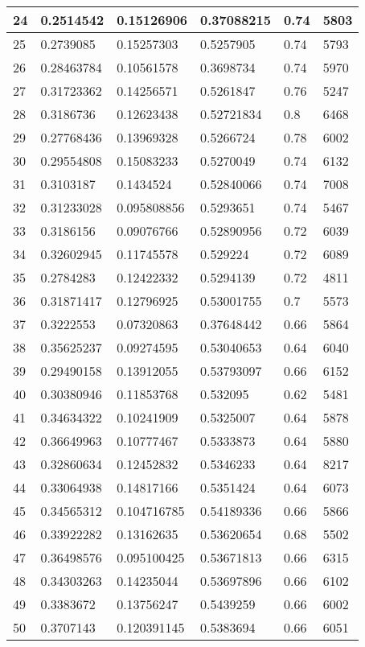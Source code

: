 \begin{longtable}{|l|l|l|l|l|l|}
24 & 0.2514542 & 0.15126906 & 0.37088215 & 0.74 & 5803 \\ \hline 
25 & 0.2739085 & 0.15257303 & 0.5257905 & 0.74 & 5793 \\ \hline 
26 & 0.28463784 & 0.10561578 & 0.3698734 & 0.74 & 5970 \\ \hline 
27 & 0.31723362 & 0.14256571 & 0.5261847 & 0.76 & 5247 \\ \hline 
28 & 0.3186736 & 0.12623438 & 0.52721834 & 0.8 & 6468 \\ \hline 
29 & 0.27768436 & 0.13969328 & 0.5266724 & 0.78 & 6002 \\ \hline 
30 & 0.29554808 & 0.15083233 & 0.5270049 & 0.74 & 6132 \\ \hline 
31 & 0.3103187 & 0.1434524 & 0.52840066 & 0.74 & 7008 \\ \hline 
32 & 0.31233028 & 0.095808856 & 0.5293651 & 0.74 & 5467 \\ \hline 
33 & 0.3186156 & 0.09076766 & 0.52890956 & 0.72 & 6039 \\ \hline 
34 & 0.32602945 & 0.11745578 & 0.529224 & 0.72 & 6089 \\ \hline 
35 & 0.2784283 & 0.12422332 & 0.5294139 & 0.72 & 4811 \\ \hline 
36 & 0.31871417 & 0.12796925 & 0.53001755 & 0.7 & 5573 \\ \hline 
37 & 0.3222553 & 0.07320863 & 0.37648442 & 0.66 & 5864 \\ \hline 
38 & 0.35625237 & 0.09274595 & 0.53040653 & 0.64 & 6040 \\ \hline 
39 & 0.29490158 & 0.13912055 & 0.53793097 & 0.66 & 6152 \\ \hline 
40 & 0.30380946 & 0.11853768 & 0.532095 & 0.62 & 5481 \\ \hline 
41 & 0.34634322 & 0.10241909 & 0.5325007 & 0.64 & 5878 \\ \hline 
42 & 0.36649963 & 0.10777467 & 0.5333873 & 0.64 & 5880 \\ \hline 
43 & 0.32860634 & 0.12452832 & 0.5346233 & 0.64 & 8217 \\ \hline 
44 & 0.33064938 & 0.14817166 & 0.5351424 & 0.64 & 6073 \\ \hline 
45 & 0.34565312 & 0.104716785 & 0.54189336 & 0.66 & 5866 \\ \hline 
46 & 0.33922282 & 0.13162635 & 0.53620654 & 0.68 & 5502 \\ \hline 
47 & 0.36498576 & 0.095100425 & 0.53671813 & 0.66 & 6315 \\ \hline 
48 & 0.34303263 & 0.14235044 & 0.53697896 & 0.66 & 6102 \\ \hline 
49 & 0.3383672 & 0.13756247 & 0.5439259 & 0.66 & 6002 \\ \hline 
50 & 0.3707143 & 0.120391145 & 0.5383694 & 0.66 & 6051 \\ \hline 
\end{longtable}